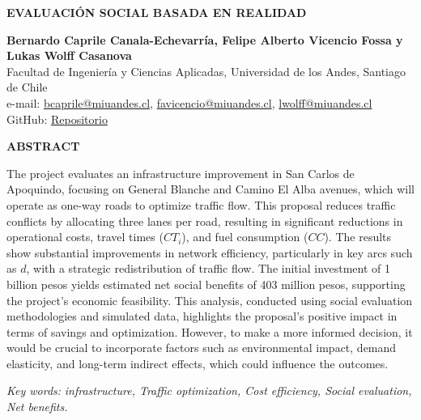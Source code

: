 \documentclass[letterpaper,12pt]{article}
\begin{document}
\begin{titlepage}
    \begin{center}
        
    
    \vspace*{1cm}


    \textbf{\Large EVALUACIÓN SOCIAL BASADA EN REALIDAD}
  
    \vspace{1cm}
    
    \textbf{Bernardo Caprile Canala-Echevarría, Felipe Alberto Vicencio Fossa y Lukas Wolff Casanova}\\
    Facultad de Ingeniería y Ciencias Aplicadas, Universidad de los Andes, Santiago de Chile\\
    e-mail: \href{mailto:bcaprile@miuandes.cl}{bcaprile@miuandes.cl}, \href{mailto:favicencio@miuandes.cl}{favicencio@miuandes.cl}, \href{mailto:lwolff@miuandes.cl}{lwolff@miuandes.cl}\\
    GitHub: \href{https://github.com/LukasWolff2002/TAREA_4_AUTITOS}{Repositorio}
    \vspace{2cm}
    
    \textbf{ABSTRACT}
    \end{center}
    \vspace{0.5cm}
    
    The project evaluates an infrastructure improvement in San Carlos de Apoquindo, focusing on General Blanche and Camino El Alba avenues, which will operate as one-way roads to optimize traffic flow. This proposal reduces traffic conflicts by allocating three lanes per road, resulting in significant reductions in operational costs, travel times ($CT_i$), and fuel consumption ($CC$). The results show substantial improvements in network efficiency, particularly in key arcs such as $d$, with a strategic redistribution of traffic flow. The initial investment of 1 billion pesos yields estimated net social benefits of 403 million pesos, supporting the project's economic feasibility. This analysis, conducted using social evaluation methodologies and simulated data, highlights the proposal's positive impact in terms of savings and optimization. However, to make a more informed decision, it would be crucial to incorporate factors such as environmental impact, demand elasticity, and long-term indirect effects, which could influence the outcomes.


    \vspace{1cm}
    
    \textit{Key words:} \textit{infrastructure, Traffic optimization, Cost efficiency, Social evaluation, Net benefits.}
    
\end{titlepage}
\end{document}
